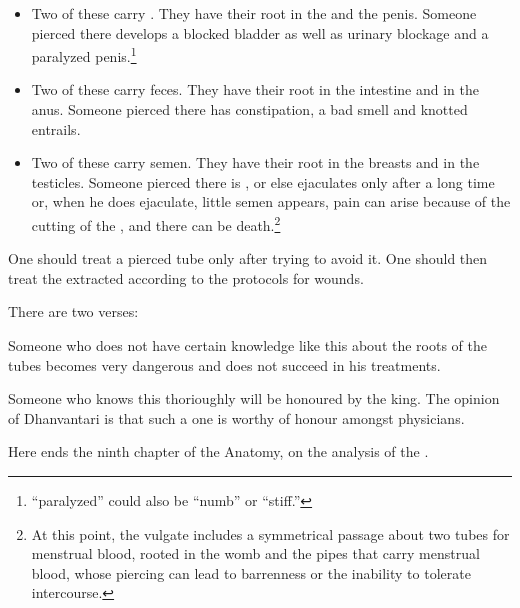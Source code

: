 \begin{translation}
\begin{itemize}
\item 

Two of these carry  .  They have their root in the
 and the penis.  Someone pierced there develops a
blocked bladder as well as urinary blockage and a paralyzed
penis.\footnote{ “paralyzed” could also be “numb” or
    “stiff.”}
    
      \item 
      
Two of these carry  feces.  They have their root in the intestine and
in the anus.  Someone pierced there has constipation, a bad smell and
knotted entrails.

\item Two of these carry  semen.  They have their root in the breasts
and in the testicles.  Someone pierced there is
, or else ejaculates only after a long time or,
when he does ejaculate, little semen appears, pain can arise because
of the cutting of the , and there can be
death.\footnote{At this point, the vulgate includes a symmetrical
    passage about two tubes for menstrual blood, rooted in the womb and
    the pipes that carry menstrual blood, whose piercing can lead to
    barrenness or the inability to tolerate intercourse.}
\end{itemize}

One should treat a pierced tube only after trying to avoid it.  One
should then treat the extracted  according
to the protocols for wounds.


\item[13.add1, 13.add2]
There are two verses:

\begin{sloka}
    Someone who does not have certain knowledge like this about the
roots of the tubes becomes very dangerous and does not succeed in
his treatments.
    
Someone who knows this thorioughly will be honoured by the king. 
The opinion of Dhanvantari is that such a one is worthy of  honour
amongst physicians.
\end{sloka}
\bigskip
{\centering
Here ends the ninth chapter of the Anatomy, on the analysis of the
.
\par}

\end{translation}

